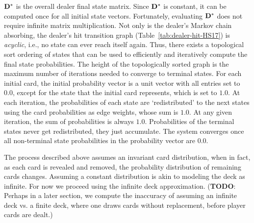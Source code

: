 $\mathbf{D^*}$ is the overall dealer final state matrix.  
Since $\mathbf{D^*}$ is constant, it can be computed once
for all initial state vectors.
Fortunately, evaluating $\mathbf{D^*}$ does not require infinite 
matrix multiplication.
Not only is the dealer's Markov chain absorbing, 
the dealer's hit transition graph
(Table~\ref{tab:dealer-hit-HS17})
is \emph{acyclic}, i.e., no state can ever reach itself again.  
Thus, there exists a topological sort
ordering of states that can be used to efficiently and iteratively 
compute the final state probabilities.
The height of the topologically sorted graph is the maximum 
number of iterations needed to converge to terminal states.
For each initial card, the initial probability vector
is a unit vector with all entries set to $0.0$, except for the state
that the initial card represents, which is set to $1.0$.
At each iteration, the probabilities of each state are 
`redistributed' to the next states using the 
card probabilities as edge weights, whose sum is $1.0$.  
At any given iteration, the sum of probabilities is always $1.0$.
Probabilities of the terminal states never get redistributed, 
they just accumulate.  
The system converges once all non-terminal state probabilities 
in the probability vector are 0.0.

The process described above assumes an invariant
card distribution, when in fact, as each card is revealed and removed, 
the probability distribution of remaining cards changes.
Assuming a constant distribution is akin to modeling
the deck as infinite.
For now we proceed using the infinite deck approximation.  
(\textbf{TODO}: Perhaps in a later section, we compute the inaccuracy of
assuming an infinite deck vs. a finite deck, where one 
draws cards without replacement, before player cards are dealt.)


\begin{comment}
\begin{table}[ht!]
\caption{Dealer's final state distribution, H17, pre-peek}
\begin{center}

\end{center}
\label{tab:dealer-final-H17-pre-peek}
\end{table}

\begin{table}[ht!]
\caption{Dealer's final state distribution, H17, post-peek}
\begin{center}

\end{center}
\label{tab:dealer-final-H17-post-peek}
\end{table}
\end{comment}

